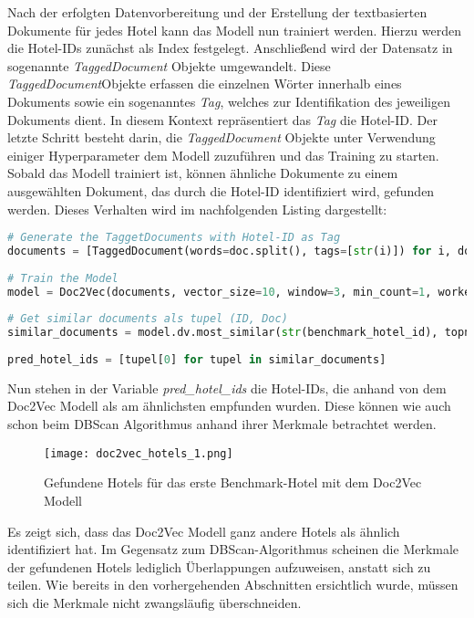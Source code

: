 Nach der erfolgten Datenvorbereitung und der Erstellung der textbasierten Dokumente für jedes Hotel kann das Modell nun trainiert werden. Hierzu werden die Hotel-IDs zunächst als Index festgelegt. Anschließend wird der Datensatz in sogenannte \emph{TaggedDocument} Objekte umgewandelt. Diese \emph{TaggedDocument}Objekte erfassen die einzelnen Wörter innerhalb eines Dokuments sowie ein sogenanntes \emph{Tag}, welches zur Identifikation des jeweiligen Dokuments dient. In diesem Kontext repräsentiert das \emph{Tag} die Hotel-ID. Der letzte Schritt besteht darin, die \emph{TaggedDocument} Objekte unter Verwendung einiger Hyperparameter dem Modell zuzuführen und das Training zu starten. Sobald das Modell trainiert ist, können ähnliche Dokumente zu einem ausgewählten Dokument, das durch die Hotel-ID identifiziert wird, gefunden werden.
\newline
\newline
Dieses Verhalten wird im nachfolgenden Listing dargestellt:
\begin{lstlisting}[language=Python, label=lst:doc2vec_exe, caption=Ausführung des Doc2Vec Modell]
# Generate the TaggetDocuments with Hotel-ID as Tag
documents = [TaggedDocument(words=doc.split(), tags=[str(i)]) for i, doc in doc2vec_df["doc"].iteritems()]
    
# Train the Model
model = Doc2Vec(documents, vector_size=10, window=3, min_count=1, workers=4, epochs=1000, alpha=0.01)
    
# Get similar documents als tupel (ID, Doc)
similar_documents = model.dv.most_similar(str(benchmark_hotel_id), topn=4)
    
pred_hotel_ids = [tupel[0] for tupel in similar_documents]
\end{lstlisting}

Nun stehen in der Variable \emph{pred\_hotel\_ids} die Hotel-IDs, die anhand von dem Doc2Vec Modell als am ähnlichsten empfunden wurden. Diese können wie auch schon beim DBScan Algorithmus anhand ihrer Merkmale betrachtet werden.

\begin{figure}[h]
    \centering
    \texttt{[image: doc2vec\_hotels\_1.png]}
    \caption[Gefundene Hotels für das erste Benchmark-Hotel mit dem Doc2Vec Modell]{Gefundene Hotels für das erste Benchmark-Hotel mit dem Doc2Vec Modell}
    \label{img:doc2vec_hotels_1}
\end{figure}

Es zeigt sich, dass das Doc2Vec Modell ganz andere Hotels als ähnlich identifiziert hat. Im Gegensatz zum DBScan-Algorithmus scheinen die Merkmale der gefundenen Hotels lediglich Überlappungen aufzuweisen, anstatt sich zu teilen. Wie bereits in den vorhergehenden Abschnitten ersichtlich wurde, müssen sich die Merkmale nicht zwangsläufig überschneiden.


